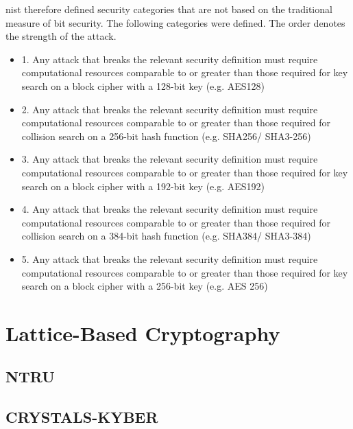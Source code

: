 \gls{nist} therefore defined security categories that are not based on the traditional measure of bit security. The following categories were defined. The order denotes the strength of the attack\cite{nist2017}.

\begin{itemize}
    \item 1. Any attack that breaks the relevant security definition must require computational resources comparable to or greater than those required for key search on a block cipher with a 128-bit key (e.g. AES128)
    \item 2. Any attack that breaks the relevant security definition must require computational resources comparable to or greater than those required for collision search on a 256-bit hash function (e.g. SHA256/ SHA3-256)
    \item 3. Any attack that breaks the relevant security definition must require computational resources comparable to or greater than those required for key search on a block cipher with a 192-bit key (e.g. AES192)
    \item 4. Any attack that breaks the relevant security definition must require computational resources comparable to or greater than those required for collision search on a 384-bit hash function (e.g. SHA384/ SHA3-384)
    \item 5. Any attack that breaks the relevant security definition must require computational resources comparable to or greater than those required for key search on a block cipher with a 256-bit key (e.g. AES 256)
\end{itemize}

\section{Lattice-Based Cryptography}


\subsection{NTRU}


\subsection{CRYSTALS-KYBER}


